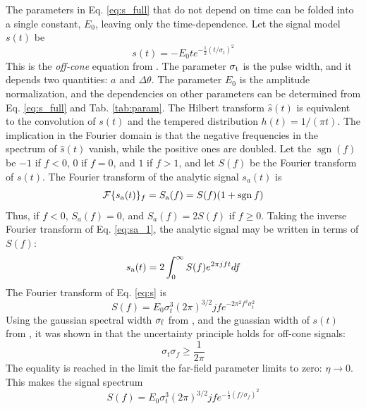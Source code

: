 \documentclass[amsmath,amssymb,aps,prd,10pt,twocolumn,showkeys]{revtex4}
\DeclareMathOperator{\sgn}{sgn}
\begin{document}
The parameters in Eq. \ref{eq:s_full} that do not depend on time can be folded into a single constant, $E_0$, leaving only the time-dependence.  Let the signal model $s(t)$ be
\begin{equation}
s(t) = -E_0 t e^{-\frac{1}{2}\left(t/\sigma_t\right)^2} \label{eq:s}
\end{equation}
This is the \textit{off-cone} equation from \cite{PhysRevD.105.123019}.  The parameter $\sigma_{\rm t}$ is the pulse width, and it depends two quantities: $a$ and $\Delta\theta$.  The parameter $E_0$ is the amplitude normalization, and the dependencies on other parameters can be determined from Eq. \ref{eq:s_full} and Tab. \ref{tab:param}.  The Hilbert transform $\widehat{s}(t)$ is equivalent to the convolution of $s(t)$ and the tempered distribution $h(t) = 1/(\pi t)$.  The implication in the Fourier domain is that the negative frequencies in the spectrum of $\hat{s}(t)$ vanish, while the positive ones are doubled.  Let the $\sgn(f)$ be $-1$ if $f<0$, $0$ if $f=0$, and $1$ if $f>1$, and let $S(f)$ be the Fourier transform of $s(t)$.  The Fourier transform of the analytic signal $s_a(t)$ is
\begin{equation}
\mathcal{F}\lbrace s_{\rm a}(t) \rbrace_{f} = S_{\rm a}(f) = S(f)(1+\sgn{f}) \label{eq:sa_1}
\end{equation}
Thus, if $f<0$, $S_a(f) = 0$, and $S_a(f) = 2S(f)$ if $f\geq 0$.  Taking the inverse Fourier transform of Eq. \ref{eq:sa_1}, the analytic signal may be written in terms of $S(f)$:
\begin{equation}
s_{\rm a}(t) = 2\int_{0}^{\infty} S(f) e^{2\pi j f t} df \label{eq:sa_2}
\end{equation}
 The Fourier transform of Eq. \ref{eq:s} is
\begin{equation}
S(f) = E_0 \sigma_t^3 (2\pi)^{3/2} j f e^{-2\pi^2 f^2 \sigma_t^2}
\end{equation}
Using the gaussian spectral width $\sigma_{\rm f}$ from \cite{10.1016/j.astropartphys.2017.03.008}, and the guassian width of $s(t)$ from \cite{PhysRevD.105.123019}, it was shown in \cite{PhysRevD.105.123019} that the uncertainty principle holds for off-cone signals:
\begin{equation}
\sigma_t \sigma_f \geq \frac{1}{2\pi}
\end{equation}
The equality is reached in the limit the far-field parameter limits to zero: $\eta \to 0$.  This makes the signal spectrum
\begin{equation}
S(f) = E_0 \sigma_t^3 (2\pi)^{3/2} j f e^{-\frac{1}{2}\left(f/\sigma_f\right)^2} \label{eq:spec}
\end{equation}
\end{document}
